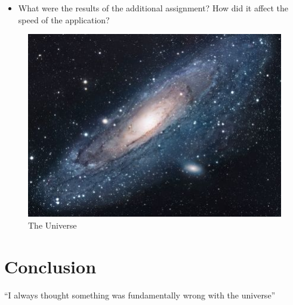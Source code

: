 \documentclass{article}
\begin{document}
\begin{itemize}
  \item What were the results of the additional assignment? How did it affect
        the speed of the application?
\end{itemize}

\begin{figure}[h!]
  \centering
  \includegraphics[scale=1.7]{universe.jpg}
  \caption{The Universe}
  \label{threadsVsSync}
\end{figure}

\section{Conclusion}

``I always thought something was fundamentally wrong with the universe'' \citep{adams1995hitchhiker}



\end{document}
